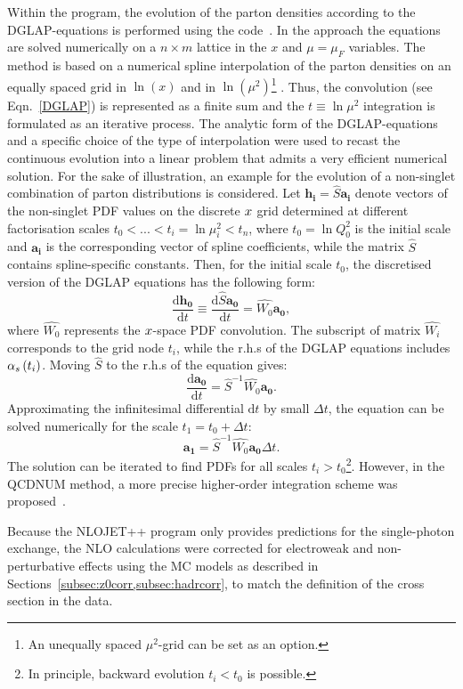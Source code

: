 Within the \herafitter program, the evolution of the parton densities according to the DGLAP-equations is performed using the \qcdnum code~\cite{Botje:2010ay}. In the \qcdnum approach the equations are solved numerically on a $n\times m$ lattice in the $x$ and $\mu=\mu_F$ variables. The method is based on a numerical spline interpolation of the parton densities on an equally spaced grid in $\ln\left(x\right)$ and in $\ln\left(\mu^2\right)$\footnote{An unequally spaced $\mu^2$-grid can be set as an option.} . Thus, the convolution (see Eqn.~\ref{DGLAP}) is represented as a finite sum and the $t \equiv \ln{\mu^2}$ integration is formulated as an iterative process.
The analytic form of the DGLAP-equations and a specific choice of the type of interpolation were used to recast the continuous evolution into a linear problem that admits a very efficient numerical solution. For the sake of illustration, an example for the evolution of a non-singlet combination of parton distributions is considered. Let $\mathbf{h_i}=\hat{S}\mathbf{a_i}$ denote vectors of the non-singlet PDF values on the discrete $\mbox{${x}$}$ grid determined at different factorisation scales $t_0 < ... < t_i=\ln{\mu^2_i} < t_n$, where $t_0=\ln{Q^2_0}$ is the initial scale and $\mathbf{a_i}$ is the corresponding vector of spline coefficients, while the matrix $\hat{S}$ contains spline-specific constants. Then, for the initial scale $t_0$, the discretised version of the DGLAP equations has the following form:
\begin{equation}
 \frac{\mathrm{d}\mathbf{h_0}}{\mathrm{d}t} \equiv \frac{\mathrm{d}\hat{S}\mathbf{a_0}}{\mathrm{d}t} = \hat{W_0}\mathbf{a_0},
\end{equation}
where $\hat{W_0}$ represents the $\mbox{${x}$}$-space PDF convolution. The subscript of matrix $\hat{W_i}$ corresponds to the grid node $t_i$, while the r.h.s of the DGLAP equations includes $\mbox{$\alpha_{s}$}\left(t_i\right)$. Moving $\hat{S}$ to the r.h.s of the equation gives:
\begin{equation}
 \frac{\mathrm{d}\mathbf{a_0}}{\mathrm{d}t} = \hat{S}^{-1}\hat{W_0}\mathbf{a_0}.
\end{equation}
Approximating the infinitesimal differential $\mathrm{d}t$ by small $\Delta t$, the equation can be solved numerically for the scale $t_1=t_0+\Delta t$:
\begin{equation}
 \mathbf{a_1} = \hat{S}^{-1}\hat{W_0}\mathbf{a_0}\Delta t.
\end{equation}
The solution can be iterated to find PDFs for all scales $t_i>t_0$\footnote{In principle, backward evolution $t_i<t_0$ is possible.}. However, in the QCDNUM method, a more precise higher-order integration scheme was proposed~\cite{Botje:2010ay}.

Because the NLOJET++ program only provides predictions for the single-photon exchange, the NLO calculations were corrected for electroweak and non-perturbative effects using the MC models as described in Sections~\ref{subsec:z0corr,subsec:hadrcorr}, to match the definition of the cross section in the data.
